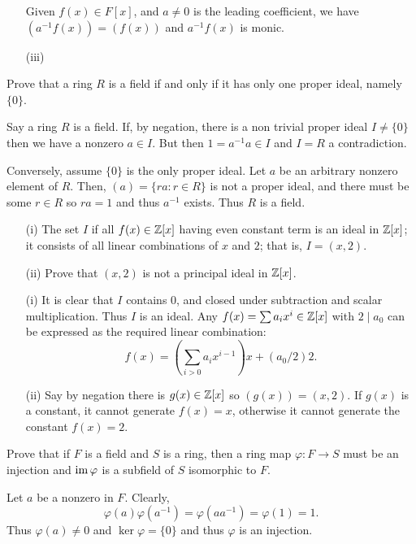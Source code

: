 \begin{myenumerate}
\begin{itemize}
   Given \(f(x)\in F[x]\), and \(a\neq 0\) is the leading coefficient,
   we have \((a^{-1}f(x))=(f(x))\) and \(a^{-1}f(x)\) is monic.
 \item[(iii)]
\end{itemize}


\item
\begin{excopy}
Prove that a ring $R$ is a field if and only if it has only one proper ideal,
namely \(\{0\}\).
\end{excopy}

Say a ring $R$ is a field. If,
by negation, there is a non trivial proper ideal \(I\neq\{0\}\)
then we have a nonzero \(a\in I\). But then
\(1=a^{-1}a\in I\) and \(I=R\) a contradiction.

Conversely, assume \(\{0\}\) is the only proper ideal.
Let $a$ be an arbitrary nonzero element of $R$.
Then, \((a)=\{ra:r\in R\}\)
is not a proper ideal, and there must be some \(r\in R\) so \(ra=1\)
and thus \(a^{-1}\) exists. Thus $R$ is a field.


\item
\begin{excopy}
\begin{itemize}
 \item[(i)]
   The set $I$ if all \(f(x)\in \mathbb{Z}[x]\) having even constant term is an ideal
   in \(\mathbb{Z}[x]\); it consists of all linear combinations of $x$ and $2$;
   that is, \(I=(x,2)\).
 \item[(ii)]
   Prove that \((x,2)\) is not a principal ideal in \(\mathbb{Z}[x]\).
\end{itemize}
\end{excopy}

\begin{itemize}
 \item[(i)]
   It is clear that $I$ contains $0$, and closed under
   subtraction and scalar multiplication. Thus $I$ is an ideal.
   Any \(f(x)=\sum a_i x^i\in \mathbb{Z}[x]\) with \(2\mid a_0\)
   can be expressed as the required linear combination:
   \[f(x) = \left(\sum_{i>0} a_ix^{i-1}\right)x + (a_0/2)2.\]
 \item[(ii)]
   Say by negation there is \(g(x)\in \mathbb{Z}[x]\) so \((g(x))=(x,2)\).
   If \(g(x)\) is a constant, it cannot generate \(f(x)=x\), otherwise
   it cannot generate the constant \(f(x)=2\).
\end{itemize}


\item
\begin{excopy}
Prove that if $F$ is a field  and $S$ is a ring,
then a ring map
\(\varphi :F \rightarrow S\) must be an injection  and \(\mathop{\rm im}\nolimits \varphi\)
is a subfield of $S$ isomorphic to $F$.
\end{excopy}

Let $a$ be a nonzero in $F$.
Clearly, \[\varphi(a)\varphi(a^{-1})=\varphi(aa^{-1})=\varphi(1)=1.\]
Thus \(\varphi(a)\neq 0\) and \(\ker \varphi=\{0\}\) and thus
\(\varphi\) is an injection.


\end{myenumerate}


